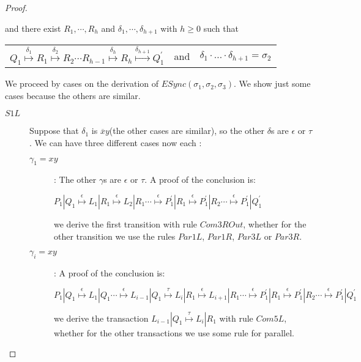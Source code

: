 \begin{proposition}
\begin{proof}
\begin{description}
	and there exist $R_{1}, \cdots, R_{h}$ and $\delta_{1}, \cdots, \delta_{h+1}$ with $h\geq 0$ such that 
	\begin{center}
	  \begin{tabular}{lll}
	    $Q_{1} \stackrel{\delta_{1}}{\longmapsto} R_{1}  \stackrel{\delta_{2}}{\longmapsto} R_{2} \cdots R_{h-1} \stackrel{\delta_{h}}{\longmapsto} R_{h} \stackrel{\delta_{h+1}}{\longmapsto} Q_{1}^{'}$ 
	  &
	    and
	  &
	    $\delta_{1} \cdot \ldots \cdot \delta_{h+1} = \sigma_{2}$
	  \end{tabular}
	\end{center}
	We proceed by cases on the derivation of $ESync(\sigma_{1}, \sigma_{2}, \sigma_{3})$. We show just some cases because the others are similar.
	\begin{description}
	  \item[$S1L$] 
	    Suppose that $\delta_{1}$ is $\overline{x}y$(the other cases are similar), so the other $\delta$s are $\epsilon$ or $\tau$. We can have three different cases now each : 
	    \begin{description}
	      \item[$\gamma_{1}=xy$]:
		The other $\gamma$s are $\epsilon$ or $\tau$. A proof of the conclusion is:
		  \begin{center}
		    $P_{1}|Q_{1} 
		      \stackrel{\epsilon}{\longmapsto} 
			L_{1}|R_{1}
		      \stackrel{\epsilon}{\longmapsto} 
			L_{2}|R_{1}
		      \cdots
		      \stackrel{\epsilon}{\longmapsto} 
			P_{1}^{'}|R_{1}
		      \stackrel{\epsilon}{\longmapsto} 
			P_{1}^{'}|R_{2}
		      \cdots
		      \stackrel{\epsilon}{\longmapsto} 
			P_{1}^{'}|Q_{1}^{'}$
		  \end{center}
		we derive the first transition with rule $Com3ROut$, whether for the other transition we use the rules $Par1L$, $Par1R$, $Par3L$ or $Par3R$.
	      \item[$\gamma_{i}=xy$]:
		A proof of the conclusion is:
		  \begin{center}
		    $P_{1}|Q_{1} \stackrel{\epsilon}{\longmapsto} L_{1}|Q_{1} 
		      \cdots
 			      \stackrel{\epsilon}{\longmapsto} L_{i-1}|Q_{1} 
 			      \stackrel{\tau}{\longmapsto} L_{i}|R_{1}
 			      \stackrel{\epsilon}{\longmapsto} L_{i+1}|R_{1}
		      \cdots 
 			      \stackrel{\epsilon}{\longmapsto} P_{1}^{'}|R_{1}
 			      \stackrel{\epsilon}{\longmapsto} P_{1}^{'}|R_{2}
		      \cdots 
 			      \stackrel{\epsilon}{\longmapsto} P_{1}^{'}|Q_{1}^{'}$
		  \end{center}
		we derive the transaction $ L_{i-1}|Q_{1} \stackrel{\tau}{\longmapsto} L_{i}|R_{1}$ with rule $Com5L$, whether for the other transactions we use some rule for parallel.

\end{description}
\end{description}
\end{description}
\end{proof}
\end{proposition}
